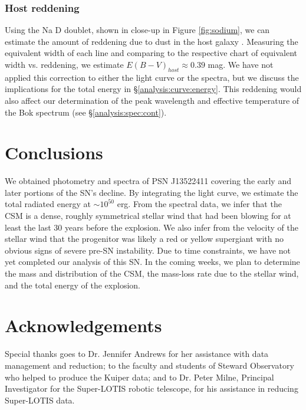 \documentclass[a4paper,fleqn,usenatbib]{mnras}
\begin{document}
\subsubsection{Host reddening} \label{analysis:spec:red}
Using the Na D doublet, shown in close-up in Figure \ref{fig:sodium}, we can estimate the amount of reddening due to dust in the host galaxy \citep{Poz12}. Measuring the equivalent width of each line and comparing to the respective chart of equivalent width vs. reddening, we estimate $E(B-V)_{host} \approx 0.39$ mag. We have not applied this correction to either the light curve or the spectra, but we discuss the implications for the total energy in \S \ref{analysis:curve:energy}. This reddening would also affect our determination of the peak wavelength and effective temperature of the Bok spectrum (see \S \ref{analysis:spec:cont}).

\section{Conclusions} \label{conclusion}

We obtained photometry and spectra of PSN J13522411 covering the early and later portions of the SN's decline. By integrating the light curve, we estimate the total radiated energy at $\sim10^{50}$ erg. From the spectral data, we infer that the CSM is a dense, roughly symmetrical stellar wind that had been blowing for at least the last 30 years before the explosion. We also infer from the velocity of the stellar wind that the progenitor was likely a red or yellow supergiant with no obvious signs of severe pre-SN instability. Due to time constraints, we have not yet completed our analysis of this SN. In the coming weeks, we plan to determine the mass and distribution of the CSM, the mass-loss rate due to the stellar wind, and the total energy of the explosion.

\section*{Acknowledgements}

Special thanks goes to Dr. Jennifer Andrews for her assistance with data management and reduction; to the faculty and students of Steward Observatory who helped to produce the Kuiper data; and to Dr. Peter Milne, Principal Investigator for the Super-LOTIS robotic telescope, for his assistance in reducing Super-LOTIS data.

\end{document}
